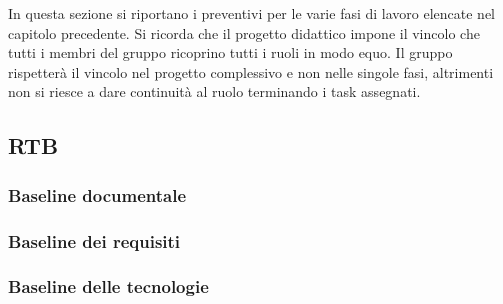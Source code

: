 In questa sezione si riportano i preventivi per le varie fasi di lavoro elencate nel capitolo precedente. \newline
Si ricorda che il progetto didattico impone il vincolo che tutti i membri del gruppo ricoprino tutti i ruoli in modo equo.
Il gruppo rispetterà il vincolo nel progetto complessivo e non nelle singole fasi, 
altrimenti non si riesce a dare continuità al ruolo terminando i task assegnati.

\subsection{RTB}
\subsubsection{Baseline documentale}

\subsubsection{Baseline dei requisiti}

\subsubsection{Baseline delle tecnologie}